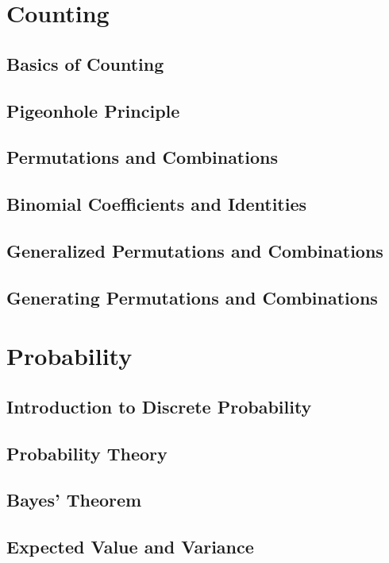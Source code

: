 \documentclass[article, 11pt]{article}
\theoremstyle{definition}
\begin{document}
    \section{Counting}
    \subsection{Basics of Counting}
    \subsection{Pigeonhole Principle}
    \subsection{Permutations and Combinations}
    \subsection{Binomial Coefficients and Identities}
    \subsection{Generalized Permutations and Combinations}
    \subsection{Generating Permutations and Combinations}
    \section{Probability}
    \subsection{Introduction to Discrete Probability}
    \subsection{Probability Theory}
    \subsection{Bayes' Theorem}
    \subsection{Expected Value and Variance} 
\end{document}

